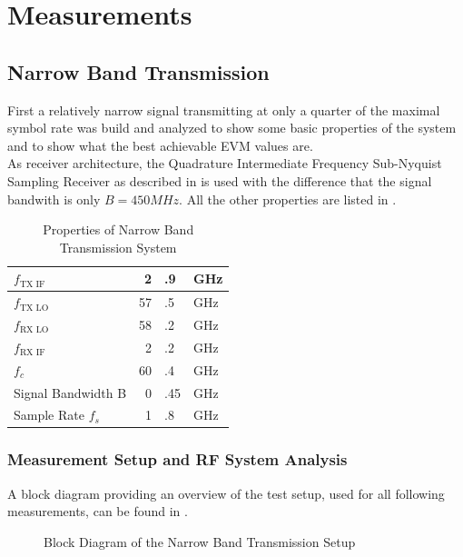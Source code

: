 \chapter{Measurements}
\section{Narrow Band Transmission}
\label{sec:res_450}

First a relatively narrow signal transmitting at only a quarter
of the maximal symbol rate was build and analyzed to show some basic
properties of the system and to show what the best achievable
\gls{EVM} values are. \\

As receiver architecture, the Quadrature Intermediate Frequency Sub-Nyquist
Sampling Receiver as described in  is used with the difference
that the signal bandwith is only $B = 450 MHz$. All the other properties are listed
in . \\

\begin{table}[h]
  \centering
  \begin{tabular}{|l|r@{}l@{~}l|}
    \hline
    $f_{\text{TX IF}}$ & 2&.9&GHz \\ \hline
    $f_{\text{TX LO}}$ & 57&.5&GHz \\ \hline
    $f_{\text{RX LO}}$ & 58&.2&GHz \\ \hline
    $f_{\text{RX IF}}$ & 2&.2&GHz \\ \hline
    $f_c$            & 60&.4&GHz \\ \hline
    Signal Bandwidth B & 0&.45&GHz \\ \hline
    Sample Rate $f_s$ & 1&.8&GHz \\ \hline
  \end{tabular}
  \caption{Properties of Narrow Band Transmission System}
  \label{tab:res_450}
\end{table}

\subsection{Measurement Setup and RF System Analysis}
A block diagram providing an overview of the test setup,
used for all following measurements, can be found in . \\

\begin{figure}[p]
  \centering
  \caption{Block Diagram of the Narrow Band Transmission Setup}
  \label{fig:res_450_bd}
\end{figure}

